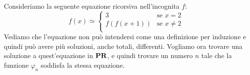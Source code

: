 \documentclass[runningheads,a4paper]{llncs}
\begin{document}
% 

\begin{exercise}
Consideriamo la seguente equazione ricorsiva nell'incognita $f$:
$$
f(x) \simeq 
\begin{cases}
3         & \mbox{se $x = 2$} \\
f(f(x+1)) & \mbox{se $x \neq 2$} \\
\end{cases}
$$
Vediamo che l'equazione non pu\`{o} intendersi come una definizione per induzione e quindi pu\`{o} avere pi\`{u} soluzioni,
 anche totali, differenti. Vogliamo ora trovare una soluzione a quest'equazione in $\mathbf{PR}$, e quindi trovare un numero $n$ tale che la funzione $\varphi_n$
 soddisfa la stessa equazione.
\end{exercise}
\end{document}
